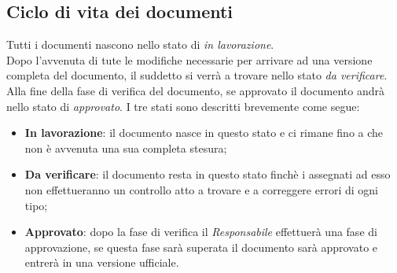 \subsection{Ciclo di vita dei documenti}
Tutti i documenti nascono nello stato di \textit{in lavorazione}.\\
Dopo l'avvenuta di tute le modifiche necessarie per arrivare ad una versione completa del documento, il suddetto si verrà a trovare nello stato \textit{da verificare}.\\
Alla fine della fase di verifica del documento, se approvato il documento andrà nello stato di \textit{approvato}.
I tre stati sono descritti brevemente come segue:
\begin{itemize}
\item \textbf{In lavorazione}: il documento nasce in questo stato e ci rimane fino a che non è avvenuta una sua completa stesura;
\item \textbf{Da verificare}: il documento resta in questo stato finchè i  assegnati ad esso non effettueranno un controllo atto a trovare e a correggere errori di ogni tipo;
\item \textbf{Approvato}: dopo la fase di verifica il \textit{Responsabile} effettuerà una fase di approvazione, se questa fase sarà superata il documento sarà approvato e entrerà in una versione ufficiale.
\end{itemize}
